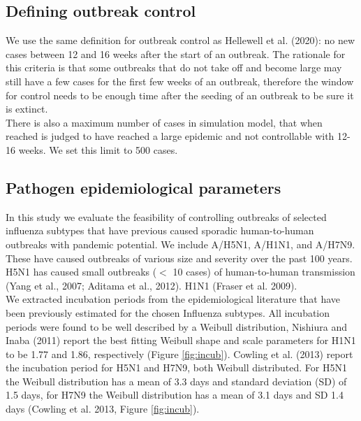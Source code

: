 \documentclass{article}
\begin{document}
\subsection{Defining outbreak control}

We use the same definition for outbreak control as Hellewell et al. (2020): no new cases between 12 and 16 weeks after the start of an outbreak. The rationale for this criteria is that some outbreaks that do not take off and become large may still have a few cases for the first few weeks of an outbreak, therefore the window for control needs to be enough time after the seeding of an outbreak to be sure it is extinct. \\

There is also a maximum number of cases in simulation model, that when reached is judged to have reached a large epidemic and not controllable with 12-16 weeks. We set this limit to 500 cases.

\subsection{Pathogen epidemiological parameters} \label{epiparameters}

In this study we evaluate the feasibility of controlling outbreaks of selected influenza subtypes that have previous caused sporadic human-to-human outbreaks with pandemic potential. We include A/H5N1, A/H1N1, and A/H7N9. These have caused outbreaks of various size and severity over the past 100 years. H5N1 has caused small outbreaks ($<$ 10 cases) of human-to-human transmission (Yang et al., 2007; Aditama et al., 2012). H1N1 (Fraser et al. 2009). \\

We extracted incubation periods from the epidemiological literature that have been previously estimated for the chosen Influenza subtypes. All incubation periods were found to be well described by a Weibull distribution, Nishiura and Inaba (2011) report the best fitting Weibull shape and scale parameters for H1N1 to be 1.77 and 1.86, respectively (Figure \ref{fig:incub}). Cowling et al. (2013) report the incubation period for H5N1 and H7N9, both Weibull distributed. For H5N1 the Weibull distribution has a mean of 3.3 days and standard deviation (SD) of 1.5 days, for H7N9 the Weibull distribution has a mean of 3.1 days and SD 1.4 days (Cowling et al. 2013, Figure \ref{fig:incub}). \\
\end{document}
